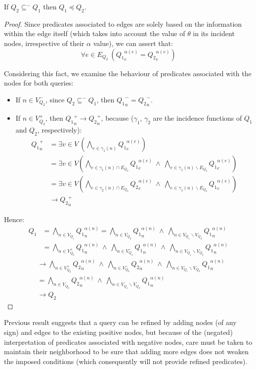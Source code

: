 \documentclass{article}%
\begin{document}
\begin{theorem}{}
    If $Q_2\subseteq^- Q_1$ then $Q_1\preceq Q_2$.
\end{theorem}
\begin{proof}{}
	Since predicates associated to edges are solely based on the information within the edge itself (which takes into account the value of $\theta$ in its incident nodes, irrespective of their $\alpha$ value), we can assert that:
	$$\forall e\in E_{Q_2}\ ({Q_1}_e^{\alpha(e)}={Q_2}_e^{\alpha(e)})$$
	
	Considering this fact, we examine the behaviour of predicates associated with the nodes for both queries:
	\begin{itemize}
		\item If  $n\in V_{Q_2}^-$, since $Q_2\subseteq^- Q_1$, then ${Q_1}_n^-={Q_2}_n^-$.
		\item If $n\in V_{Q_2}^+$, then ${Q_1}_n^+\rightarrow {Q_2}_n^+$, because ($\gamma_1$, $\gamma_2$ are the incidence functions of $Q_1$ and $Q_2$, respectively):
		\begin{align*}
		{Q_1}_n^+   &= \exists v\in V\ \left( \bigwedge_{e\in \gamma_1(n)} {Q_1}_e^{\alpha(e)}\right)\\
		&= \exists v\in V\left( \bigwedge_{e\in \gamma_1(n)\cap E_{Q_2}} {Q_1}_e^{\alpha(e)}\ \wedge \ \bigwedge_{e\in \gamma_1(n)\smallsetminus E_{Q_2}} {Q_1}_e^{\alpha(e)}\right)\\
		&= \exists v\in V\left( \bigwedge_{e\in \gamma_2(n)\cap E_{Q_2}} {Q_2}_e^{\alpha(e)}\ \wedge \ \bigwedge_{e\in \gamma_1(n)\smallsetminus E_{Q_2}} {Q_1}_e^{\alpha(e)}\right)\\
		&\rightarrow {Q_2}_n^+
		\end{align*}
	\end{itemize}
	Hence:
	\begin{align*}
	Q_1 &= \bigwedge_{n\in V_{Q_1}} {Q_1}_n^{\alpha(n)} = \bigwedge_{n\in V_{Q_2}} {Q_1}_n^{\alpha(n)} \ \wedge \ \bigwedge_{n\in V_{Q_1}\smallsetminus V_{Q_2}} {Q_1}_n^{\alpha(n)}\\
	&= \bigwedge_{n\in V_{Q_2}^+} {Q_1}_n^{\alpha(n)} \ \wedge \ \bigwedge_{n\in V_{Q_2}^-} {Q_1}_n^{\alpha(n)} \ \wedge \ \bigwedge_{n\in V_{Q_1}\smallsetminus V_{Q_2}} {Q_1}_n^{\alpha(n)}
	\end{align*}
	\begin{align*}
	&\rightarrow \bigwedge_{n\in V_{Q_2}^+} {Q_2}_n^{\alpha(n)} \ \wedge \ \bigwedge_{n\in V_{Q_2}^-} {Q_2}_n^{\alpha(n)} \ \wedge \ \bigwedge_{n\in V_{Q_1}\smallsetminus V_{Q_2}} {Q_1}_n^{\alpha(n)}\\ 
	&= \bigwedge_{n\in V_{Q_2}} {Q_2}_n^{\alpha(n)} \ \wedge \ \bigwedge_{n\in V_{Q_1}\smallsetminus V_{Q_2}} {Q_1}_n^{\alpha(n)}\\
	&\rightarrow {Q_2}
	\end{align*}
\end{proof}
Previous result suggests that a query can be refined by adding nodes (of any sign) and edges to the existing positive nodes, but because of the (negated) interpretation of predicates associated with negative nodes, care must be taken to maintain their neighborhood to be sure that adding more edges does not weaken the imposed conditions (which consequently will not provide refined predicates).
\end{document}
